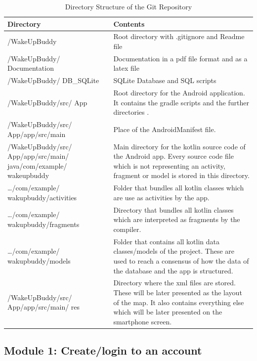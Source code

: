 \documentclass[conference]{IEEEtran}
\begin{document}
\begin{table}[h]
\caption{Directory Structure of the Git Repository}
\def\arraystretch{1.24} \small
    \begin{tabular}{|p{2.6cm}|p{5.0cm}|}
	\hline
	Directory & Contents\\
      \hline
       /WakeUpBuddy & Root directory with .gitignore and Readme file \\
	\hline
        /WakeUpBuddy/ Documentation & Documentation in a pdf file format and as a latex file\\
	\hline
        /WakeUpBuddy/ DB\_SQLite & SQLite Database and SQL scripts\\
	\hline
	/WakeUpBuddy/src/ App & Root directory for the Android application. It contains the gradle scripts and the further directories .\\
    \hline
    /WakeUpBuddy/src/ App/app/src/main & Place of the AndroidManifest file. \\
    \hline
	/WakeUpBuddy/src/ App/app/src/main/ java/com/example/ wakeupbuddy & Main directory for the kotlin source code of the Android app. Every source code file which is not representing an activity, fragment or model is stored in this directory.\\

    \hline
    …/com/example/ wakupbuddy/activities & Folder that bundles all kotlin classes which are use as activities by the app. \\
    \hline
    …/com/example/ wakupbuddy/fragments & Directory that bundles all kotlin classes which are interpreted as fragments by the compiler. \\
    \hline
    …/com/example/ wakupbuddy/models & Folder that contains all kotlin data classes/models of the project. These are used to reach a consensus of how the data of the database and the app is structured. \\
    \hline
    /WakeUpBuddy/src/ App/app/src/main/ res & Directory where the xml files are stored. These will be later presented as the layout of the map. It also contains everything else which will be later presented on the smartphone screen. \\
	\hline
	\end{tabular}
\end{table}   

\subsection{Module 1: Create/login to an account}
\end{document}
